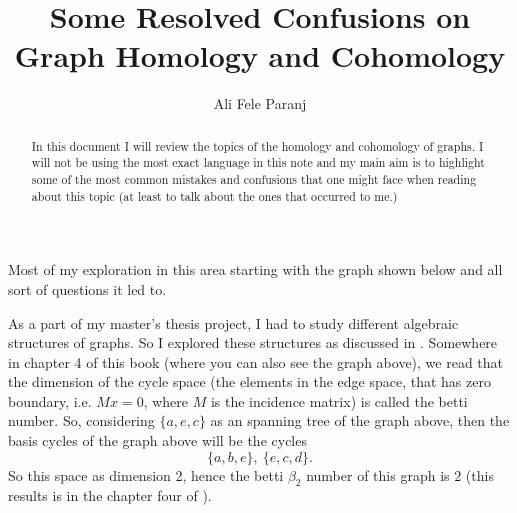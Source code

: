 \documentclass[11pt,a4paper]{article}
\title{Some Resolved Confusions on Graph Homology and Cohomology}
\author{Ali Fele Paranj}
\begin{document}
	
	\maketitle
	\begin{abstract}
		In this document I will review the topics of the homology and cohomology of graphs. I will not be using the most exact language in this note and my main aim is to highlight some of the most common mistakes and confusions that one might face when reading about this topic (at least to talk about the ones that occurred to me.)
		
	\end{abstract}
	
	
	Most of my exploration in this area starting with the graph shown below and all sort of questions it led to.
	\begin{figure}[h!]
		\centering
	\end{figure}
	
	As a part of my master's thesis project, I had to study different algebraic structures of graphs. So I explored these structures as discussed in \cite{Gross2005}. Somewhere in chapter 4 of this book (where you can also see the graph above), we read that the dimension of the cycle space (the elements in the edge space, that has zero boundary, i.e. $ Mx = 0 $, where $ M $ is the incidence matrix) is called the betti number. So, considering $ \{a,e,c\}  $ as an spanning tree of the graph above, then the basis cycles of the graph above will be the cycles
	\[ \{ a,b,e \}, \ \{e,c,d\}. \]
	So this space as dimension 2, hence the betti $ \beta_2 $ number of this graph is $ 2 $ (this results is in the chapter four of \cite{Gross2005}).
	
\end{document}
